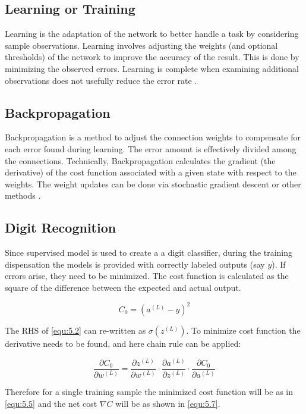 \documentclass[12pt, a4paper]{report}
\begin{document}
\subsection{Learning or Training}
Learning is the adaptation of the network to better handle a task by considering sample observations. Learning involves adjusting the weights (and optional thresholds) of the network to improve the accuracy of the result. This is done by minimizing the observed errors. Learning is complete when examining additional observations does not usefully reduce the error rate \cite{wiki:anns}.

\subsection{Backpropagation}
Backpropagation is a method to adjust the connection weights to compensate for each error found during learning. The error amount is effectively divided among the connections. Technically, Backpropagation calculates the gradient (the derivative) of the cost function associated with a given state with respect to the weights. The weight updates can be done via stochastic gradient descent or other methods \cite{wiki:anns}.

\subsection{Digit Recognition}
Since supervised model is used to create a a digit classifier, during the training dispensation the models is provided with correctly labeled outputs (say $y$). If errors arise, they need to be minimized. The cost function is calculated as the square of the difference between the expected and actual output.

\begin{equation}
    \label{equ:5.3}
    C_0 = (a^{(L)} - y)^2
\end{equation}

The RHS of \eqref{equ:5.2} can re-written as $\sigma(z^{(L)})$. To minimize cost function the derivative needs to be found, and here chain rule can be applied:

\begin{equation}
    \label{equ:5.4}
    \frac{\partial C_0}{\partial w^{(L)}} = \frac{\partial z^{(L)}}{\partial w^{(L)}} \cdot \frac{\partial a^{(L)}}{\partial z^{(L)}} \cdot \frac{\partial C_0}{\partial a^{(L)}}
\end{equation}

Therefore for a single training sample the minimized cost function will be as in \eqref{equ:5.5} and the net cost $\nabla C$ will be as shown in \eqref{equ:5.7}.
\end{document}
